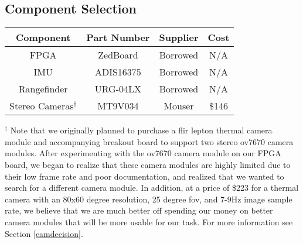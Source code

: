 \subsection{Component Selection}

\begin{center}
\begin{tabular}{ |c|c|c|c| } 
 \hline
 \textbf{Component} & \textbf{Part Number}  & \textbf{Supplier} & \textbf{Cost}  \\ \hline
 FPGA & ZedBoard & Borrowed & N/A  \\ \hline
 IMU & ADIS16375 & Borrowed & N/A  \\ \hline
 Rangefinder & URG-04LX & Borrowed & N/A  \\ \hline
 Stereo Cameras$^\dagger$ & MT9V034 & Mouser & \$146  \\ 
 \hline
\end{tabular}
\end{center}
$^\dagger$ Note that we originally planned to purchase a flir lepton thermal camera module and accompanying breakout board to support two stereo ov7670 camera modules. After experimenting with the ov7670 camera module on our FPGA board, we began to realize that these camera modules are highly limited due to their low frame rate and poor documentation, and realized that we wanted to search for a different camera module. In addition, at a price of \$223 for a thermal camera with an 80x60 degree resolution, 25 degree fov, and 7-9Hz image sample rate, we believe that we are much better off spending our money on better camera modules that will be more usable for our task. For more information see Section  \ref{camdecision}.